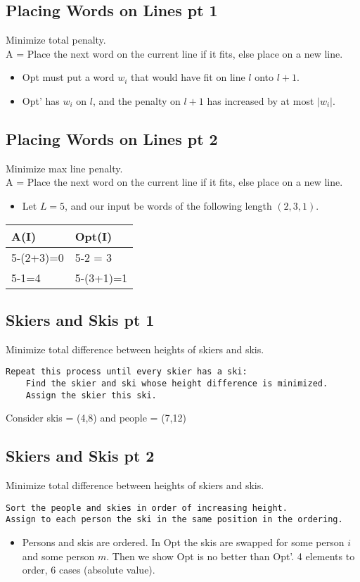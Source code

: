 \documentclass[12pt]{article}
\begin{document}
\subsection{Placing Words on Lines pt 1}
Minimize total penalty.\\
A = Place the next word on the current line if it fits, else place on a new line.
\begin{itemize}
  \item Opt must put a word $w_i$ that would have fit on line $l$ onto $l+1$.
  \item Opt' has $w_i$ on $l$, and the penalty on $l+1$ has increased by at most $|w_i|$.
\end{itemize}

\subsection{Placing Words on Lines pt 2}
Minimize max line penalty.\\
A = Place the next word on the current line if it fits, else place on a new line.
\begin{itemize}
  \item Let $L = 5$, and our input be words of the following length $(2,3,1)$.
\end{itemize}
\begin{center}
\begin{tabular}{l | l}
  A(I) & Opt(I)\\
  \hline
  5-(2+3)=0 & 5-2 = 3\\
  5-1=4     & 5-(3+1)=1\\
\end{tabular}
\end{center}


\subsection{Skiers and Skis pt 1}
Minimize total difference between heights of skiers and skis.\\
\begin{verbatim}
Repeat this process until every skier has a ski:
    Find the skier and ski whose height difference is minimized.
    Assign the skier this ski.
\end{verbatim}
Consider skis = (4,8) and people = (7,12)


\subsection{Skiers and Skis pt 2}
Minimize total difference between heights of skiers and skis.\\
\begin{verbatim}
Sort the people and skies in order of increasing height.
Assign to each person the ski in the same position in the ordering.
\end{verbatim}
 \begin{itemize}
  \item Persons and skis are ordered. In Opt the skis are swapped for some person $i$ and some person $m$. Then we show Opt is no better than Opt'. 4 elements to order, 6 cases (absolute value).
\end{itemize}
\end{document}
